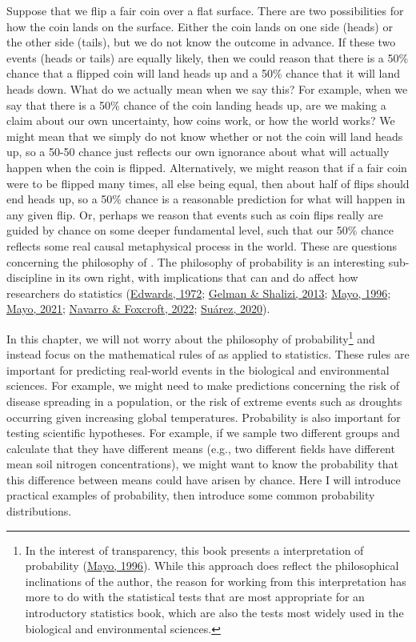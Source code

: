 \documentclass[
  openany]{krantz}
\begin{document}
Suppose that we flip a fair coin over a flat surface.
There are two possibilities for how the coin lands on the surface.
Either the coin lands on one side (heads) or the other side (tails), but we do not know the outcome in advance.
If these two events (heads or tails) are equally likely, then we could reason that there is a 50\% chance that a flipped coin will land heads up and a 50\% chance that it will land heads down.
What do we actually mean when we say this?
For example, when we say that there is a 50\% chance of the coin landing heads up, are we making a claim about our own uncertainty, how coins work, or how the world works?
We might mean that we simply do not know whether or not the coin will land heads up, so a 50-50 chance just reflects our own ignorance about what will actually happen when the coin is flipped.
Alternatively, we might reason that if a fair coin were to be flipped many times, all else being equal, then about half of flips should end heads up, so a 50\% chance is a reasonable prediction for what will happen in any given flip.
Or, perhaps we reason that events such as coin flips really are guided by chance on some deeper fundamental level, such that our 50\% chance reflects some real causal metaphysical process in the world.
These are questions concerning the philosophy of .
The philosophy of probability is an interesting sub-discipline in its own right, with implications that can and do affect how researchers do statistics (\protect\hyperlink{ref-Edwards1972}{Edwards, 1972}; \protect\hyperlink{ref-Gelman2013}{Gelman \& Shalizi, 2013}; \protect\hyperlink{ref-Mayo1996}{Mayo, 1996}; \protect\hyperlink{ref-Mayo2021}{Mayo, 2021}; \protect\hyperlink{ref-Navarro2022}{Navarro \& Foxcroft, 2022}; \protect\hyperlink{ref-Suarez2020}{Suárez, 2020}).

In this chapter, we will not worry about the philosophy of probability\footnote{In the interest of transparency, this book presents a \emph{} interpretation of probability (\protect\hyperlink{ref-Mayo1996}{Mayo, 1996}). While this approach does reflect the philosophical inclinations of the author, the reason for working from this interpretation has more to do with the statistical tests that are most appropriate for an introductory statistics book, which are also the tests most widely used in the biological and environmental sciences.} and instead focus on the mathematical rules of  as applied to statistics.
These rules are important for predicting real-world events in the biological and environmental sciences.
For example, we might need to make predictions concerning the risk of disease spreading in a population, or the risk of extreme events such as droughts occurring given increasing global temperatures.
Probability is also important for testing scientific hypotheses.
For example, if we sample two different groups and calculate that they have different means (e.g., two different fields have different mean soil nitrogen concentrations), we might want to know the probability that this difference between means could have arisen by chance.
Here I will introduce practical examples of probability, then introduce some common probability distributions.
\end{document}
